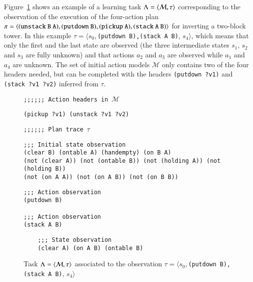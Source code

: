Figure~\ref{fig:example-plans} shows an example of a learning task $\Lambda={\langle \mathcal{M},\tau \rangle}$ corresponding to the observation of the execution of the four-action plan $\pi={\langle \small\tt (unstack\ B\ A), (putdown\ B), (pickup\ A), (stack\ A\ B) \rangle}$ for inverting a two-block tower. In this example $\tau=\langle s_0,${\small\tt (putdown\ B),(stack\ A\ B)}, $s_4\rangle$, which means that only the first and the last state are observed (the three intermediate states $s_1$, $s_2$ and $s_3$ are fully unknown) and that actions $a_2$ and $a_3$ are observed while $a_1$ and $a_4$ are unknown. The set of initial action models $\mathcal{M}$ only contains two of the four headers needed, but can be completed with the headers {\small\tt(putdown ?v1)} and {\small\tt(stack ?v1 ?v2)} inferred from $\tau$.

\begin{figure}[hbt!]
{\footnotesize\tt ;;;;;; Action headers in $\mathcal{M}$}
\begin{footnotesize}
\begin{verbatim}
(pickup ?v1) (unstack ?v1 ?v2)
\end{verbatim}
\end{footnotesize}
\vspace{0.2cm}
{\footnotesize\tt ;;;;;; Plan trace $\tau$}
\begin{footnotesize}
\begin{verbatim}
;;; Initial state observation
(clear B) (ontable A) (handempty) (on B A)
(not (clear A)) (not (ontable B)) (not (holding A)) (not (holding B))
(not (on A A)) (not (on A B)) (not (on B B))
\end{verbatim}
\end{footnotesize}

\begin{footnotesize}
\begin{verbatim}
;;; Action observation
(putdown B)

;;; Action observation
(stack A B)
\end{verbatim}
\end{footnotesize}

\begin{footnotesize}
	\begin{verbatim}
	;;; State observation
	(clear A) (on A B) (ontable B) 
	\end{verbatim}
\end{footnotesize}

 \caption{\small Task $\Lambda={\langle \mathcal{M},\tau \rangle}$ associated to the observation $\tau=\langle s_0,${\small\tt (putdown\ B),(stack\ A\ B)}, $s_4\rangle$}
\label{fig:example-plans}
\end{figure}

